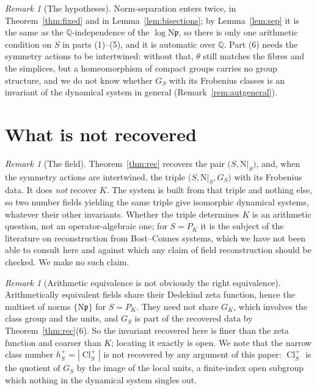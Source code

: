 \documentclass[11pt]{amsart}
\numberwithin{equation}{section}
\theoremstyle{definition}
\theoremstyle{remark}
\newtheorem{remark}[theorem]{Remark}
\newcommand{\Q}{\mathbb{Q}}
\newcommand{\pp}{\mathfrak{p}}
\newcommand{\Ns}{\mathrm{N}}
\newcommand{\Cl}{\operatorname{Cl}}
\begin{document}
\begin{remark}[The hypotheses]\label{rem:indep}
Norm-separation enters twice, in Theorem~\ref{thm:fixed} and in
Lemma~\ref{lem:bisections}; by Lemma~\ref{lem:sep} it is the same as the $\Q$-independence
of the $\log\Ns\pp$, so there is only one arithmetic condition on $S$ in parts (1)--(5), and
it is automatic over $\Q$. Part (6) needs the symmetry actions to be intertwined: without
that, $\theta$ still matches the fibres and the simplices, but a homeomorphism of compact
groups carries no group structure, and we do not know whether $G_S$ with its Frobenius
classes is an invariant of the dynamical system in general (Remark~\ref{rem:autgeneral}).
\end{remark}

\section{What is not recovered}

\begin{remark}[The field]\label{rem:field}
Theorem~\ref{thm:rec} recovers the pair $\bigl(S,\Ns|_S\bigr)$, and, when the symmetry
actions are intertwined, the triple $\bigl(S,\Ns|_S,G_S\bigr)$ with its Frobenius data. It does
\emph{not} recover $K$. The system is built from that triple and nothing else, so two
number fields yielding the same triple give isomorphic dynamical systems, whatever their
other invariants. Whether the triple determines $K$ is an arithmetic question, not an
operator-algebraic one; for $S=P_K$ it is the subject of the literature on reconstruction from
Bost--Connes systems, which we have not been able to consult here and against which any claim
of field reconstruction should be checked. We make no such claim.
\end{remark}

\begin{remark}[Arithmetic equivalence is not obviously the right equivalence]\label{rem:arith}
Arithmetically equivalent fields share their Dedekind zeta function, hence the multiset of
norms $\{\Ns\pp\}$ for $S=P_K$. They need not share $G_K$, which involves the class group and
the units, and $G_S$ is part of the recovered data by
Theorem~\ref{thm:rec}(6). So the invariant recovered here is finer than the zeta function and
coarser than $K$; locating it exactly is open. We note that the narrow class number
$h^+_S=|\Cl^+_S|$ is not recovered by any argument of this paper: $\Cl^+_S$ is the quotient of
$G_S$ by the image of the local units, a finite-index open subgroup which nothing in the
dynamical system singles out.
\end{remark}
\end{document}
